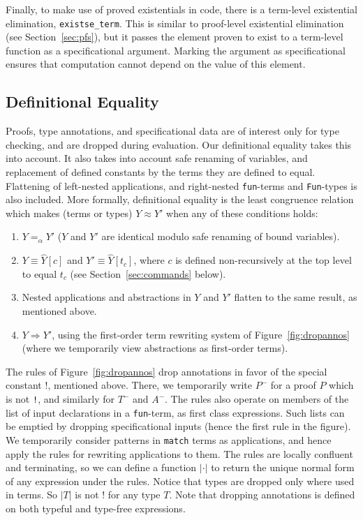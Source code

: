 \documentclass[preprint,natbib]{sigplanconf}
\newcommand{\bang}[0]{\texttt{!}}
\newcommand{\To}{\Rightarrow}
\begin{document}
Finally, to make use of proved existentials in code, there is a
term-level existential elimination, \texttt{existse\_term}.  This is
similar to proof-level existential elimination (see
Section~\ref{sec:pfs}), but it passes the element proven to exist to a
term-level function as a specificational argument.  Marking the
argument as specificational ensures that computation cannot depend on
the value of this element.


\subsection{Definitional Equality}
\label{sec:defeq}

Proofs, type annotations, and specificational data are of interest
only for type checking, and are dropped during evaluation.  Our
definitional equality takes this into account.  It also takes into
account safe renaming of variables, and replacement of defined
constants by the terms they are defined to equal.  Flattening of
left-nested applications, and right-nested \texttt{fun}-terms and
\texttt{Fun}-types is also included.  More formally, definitional
equality is the least congruence relation which makes (terms or types)
$Y \approx Y'$ when any of these conditions holds:
\begin{enumerate}
\item $Y =_\alpha Y'$ ($Y$ and $Y'$ are identical modulo safe renaming
of bound variables).
\item $Y \equiv \hat{Y}[c]$ and $Y' \equiv \hat{Y}[t_c]$, where $c$ is
defined non-recursively at the top level to equal $t_c$ (see
Section~\ref{sec:commands} below).
\item Nested applications and abstractions in $Y$ and $Y'$ flatten
to the same result, as mentioned above.
\item $Y \To Y'$, using the first-order term rewriting system of
Figure~\ref{fig:dropannos} (where we temporarily view abstractions
as first-order terms).
\end{enumerate}

\noindent The rules of Figure~\ref{fig:dropannos} drop annotations in
favor of the special constant $\bang$, mentioned above.  There, we
temporarily write $P^-$ for a proof $P$ which is not \bang, and
similarly for $T^-$ and $A^-$.  The rules also operate on members of
the list of input declarations in a \texttt{fun}-term, as first class
expressions.  Such lists can be emptied by dropping specificational
inputs (hence the first rule in the figure).  We temporarily consider
patterns in \texttt{match} terms as applications, and hence apply the
rules for rewriting applications to them.  The rules are locally
confluent and terminating, so we can define a function $|\cdot|$ to
return the unique normal form of any expression under the rules.
Notice that types are dropped only where used in terms.  So $|T|$ is
not $\bang$ for any type $T$.  Note that dropping annotations is
defined on both typeful and type-free expressions.
\end{document}
